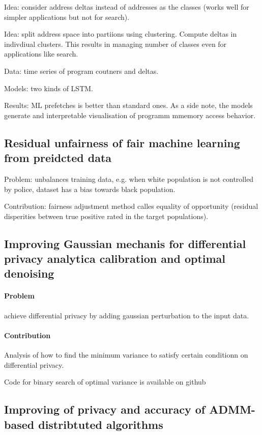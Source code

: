 \documentclass[11pt,oneside,a4paper]{scrartcl}
\begin{document}
Idea: consider address deltas instead of addresses as the classes
(works well for simpler applications but not for search).

Idea: split address space into partiions using clustering. Compute deltas
in indivdiual clusters. This results in managing number of classes
even for applications like search.

Data: time series of program coutners and deltas.

Models: two kinds of LSTM.

Results: ML prefetches is better than standard ones. As a side note,
the models generate and interpretable visualisation of programm
mmemory access behavior.

\subsection{Residual unfairness of fair machine learning from
  preidcted data}
\label{sec:resid-unfa-fair}

Problem: unbalances training data, e.g. when white population is not
controlled by police, dataset has a bias towards black population.

Contribution: fairness adjustment method calles equality of
opportunity (residual disperities between true positive rated in the
target populations).

\subsection{Improving Gaussian mechanis for differential privacy
  analytica calibration and optimal denoising}
\label{sec:impr-gauss-mech}

\paragraph{Problem}
 achieve differential privacy by adding gaussian perturbation
to the input data.

\paragraph{Contribution}
 Analysis of how to find the minimum variance to satisfy certain
conditionn on differential privacy.

Code for binary search of optimal variance is available on github

\subsection{Improving of privacy and accuracy of ADMM-based
  distribtuted algorithms}
\label{sec:impr-priv-accur}
\end{document}
